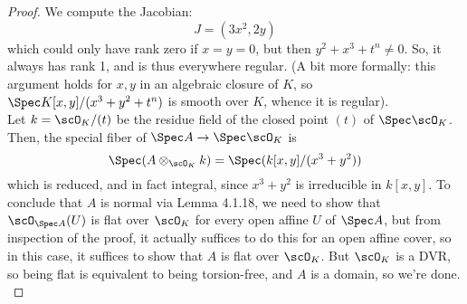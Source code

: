 \begin{proof}
	We compute the Jacobian:
	\[ J = (3x^2,2y) \]
	which could only have rank zero if $x=y=0$, but then $y^2+x^3+t^n \neq 0$. So, it always has rank 1, and is thus everywhere regular. (A bit more formally: this argument holds for $x,y$ in an algebraic closure of $K$, so $\Spec K[x,y]/(x^3+y^2+t^n)$ is smooth over $K$, whence it is regular).  \\
	
	Let $k = \scO_K/(t)$ be the residue field of the closed point $(t)$ of $\Spec \scO_K$. Then, the special fiber of $\Spec A \to \Spec \scO_K$ is
	\[ \Spec(A \otimes_{\scO_K} k) = \Spec(k[x,y]/(x^3+y^2)) \]
	which is reduced, and in fact integral, since $x^3+y^2$ is irreducible in $k[x,y]$. To conclude that $A$ is normal via Lemma 4.1.18, we need to show that $\scO_{\Spec A}(U)$ is flat over $\scO_K$ for every open affine $U$ of $\Spec A$, but from inspection of the proof, it actually suffices to do this for an open affine cover, so in this case, it suffices to show that $A$ is flat over $\scO_K$. But $\scO_K$ is a DVR, so being flat is equivalent to being torsion-free, and $A$ is a domain, so we're done. \\
	
	
\end{proof}
